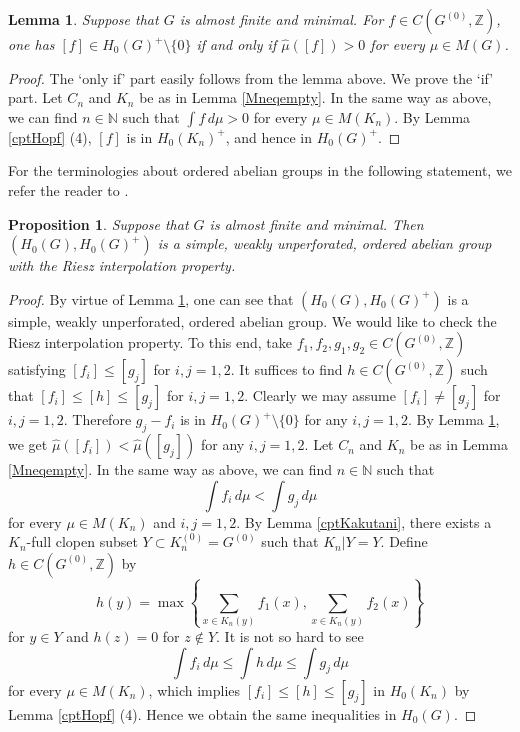 \documentclass[11pt]{article}
\newtheorem{lem}[thm]{Lemma}
\newtheorem{prop}[thm]{Proposition}
\theoremstyle{definition}
\newcommand{\N}{\mathbb{N}}
\newcommand{\Z}{\mathbb{Z}}
\begin{document}
\begin{lem}\label{positive}
Suppose that $G$ is almost finite and minimal. 
For $f\in C(G^{(0)},\Z)$, one has 
$[f]\in H_0(G)^+\setminus\{0\}$ if and only if 
$\hat\mu([f])>0$ for every $\mu\in M(G)$. 
\end{lem}
\begin{proof}
The `only if' part easily follows from the lemma above. 
We prove the `if' part. 
Let $C_n$ and $K_n$ be as in Lemma \ref{Mneqempty}. 
In the same way as above, we can find $n\in\N$ such that 
$\displaystyle\int f\,d\mu>0$ for every $\mu\in M(K_n)$. 
By Lemma \ref{cptHopf} (4), 
$[f]$ is in $H_0(K_n)^+$, and hence in $H_0(G)^+$. 
\end{proof}

For the terminologies about ordered abelian groups 
in the following statement, 
we refer the reader to \cite{Ro}. 

\begin{prop}\label{Riesz}
Suppose that $G$ is almost finite and minimal. 
Then $(H_0(G),H_0(G)^+)$ is 
a simple, weakly unperforated, ordered abelian group 
with the Riesz interpolation property. 
\end{prop}
\begin{proof}
By virtue of Lemma \ref{positive}, 
one can see that $(H_0(G),H_0(G)^+)$ is 
a simple, weakly unperforated, ordered abelian group. 
We would like to check the Riesz interpolation property. 
To this end, take $f_1,f_2,g_1,g_2\in C(G^{(0)},\Z)$ 
satisfying $[f_i]\leq[g_j]$ for $i,j=1,2$. 
It suffices to find $h\in C(G^{(0)},\Z)$ 
such that $[f_i]\leq[h]\leq[g_j]$ for $i,j=1,2$. 
Clearly we may assume $[f_i]\neq[g_j]$ for $i,j=1,2$. 
Therefore $g_j-f_i$ is in $H_0(G)^+\setminus\{0\}$ for any $i,j=1,2$. 
By Lemma \ref{positive}, 
we get $\hat\mu([f_i])<\hat\mu([g_j])$ for any $i,j=1,2$. 
Let $C_n$ and $K_n$ be as in Lemma \ref{Mneqempty}. 
In the same way as above, we can find $n\in\N$ such that 
\[
\int f_i\,d\mu<\int g_j\,d\mu
\]
for every $\mu\in M(K_n)$ and $i,j=1,2$. 
By Lemma \ref{cptKakutani}, 
there exists a $K_n$-full clopen subset $Y\subset K_n^{(0)}=G^{(0)}$ 
such that $K_n|Y=Y$. 
Define $h\in C(G^{(0)},\Z)$ by 
\[
h(y)=\max\left\{\sum_{x\in K_n(y)}f_1(x),\sum_{x\in K_n(y)}f_2(x)\right\}
\]
for $y\in Y$ and $h(z)=0$ for $z\notin Y$. 
It is not so hard to see 
\[
\int f_i\,d\mu\leq\int h\,d\mu\leq\int g_j\,d\mu
\]
for every $\mu\in M(K_n)$, 
which implies $[f_i]\leq[h]\leq[g_j]$ in $H_0(K_n)$ 
by Lemma \ref{cptHopf} (4). 
Hence we obtain the same inequalities in $H_0(G)$. 
\end{proof}
\end{document}
